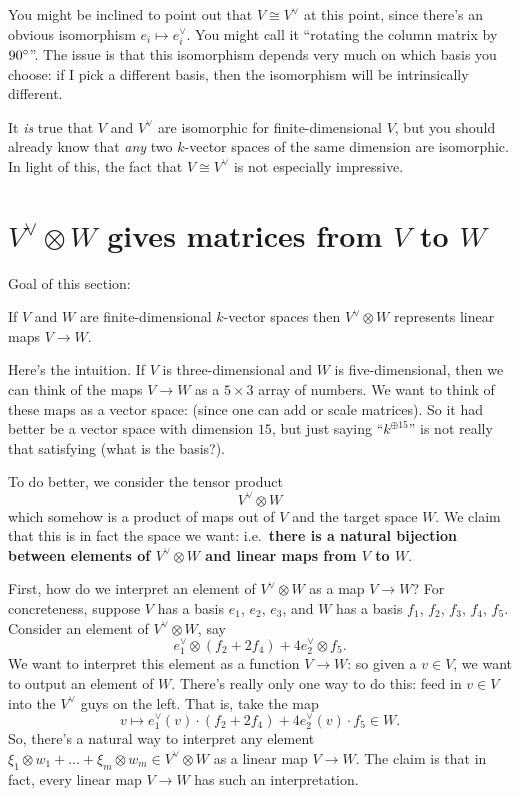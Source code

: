 You might be inclined to point out that $V \cong V^\vee$ at this point,
since there's an obvious isomorphism $e_i \mapsto e_i^\vee$.
You might call it ``rotating the column matrix by $90^\circ$''.
The issue is that this isomorphism
depends very much on which basis you choose:
if I pick a different basis, then the isomorphism
will be intrinsically different.

It \emph{is} true that $V$ and $V^\vee$ are isomorphic
for finite-dimensional $V$,
but you should already know that \emph{any} two $k$-vector spaces
of the same dimension are isomorphic.
In light of this, the fact that $V \cong V^\vee$ is not especially impressive.

\section{$V^\vee \otimes W$ gives matrices from $V$ to $W$}
Goal of this section:
\begin{moral}
	If $V$ and $W$ are finite-dimensional $k$-vector spaces
	then $V^\vee \otimes W$ represents linear maps $V \to W$.
\end{moral}

Here's the intuition.
If $V$ is three-dimensional and $W$ is five-dimensional, then we can think
of the maps $V \to W$ as a $5 \times 3$ array of numbers.
We want to think of these maps as a vector space:
(since one can add or scale matrices).
So it had better be a vector space with dimension $15$,
but just saying ``$k^{\oplus 15}$'' is not really that satisfying
(what is the basis?).

To do better, we consider the tensor product
\[ V^\vee \otimes W \]
which somehow is a product of maps out of $V$ and the target space $W$.
We claim that this is in fact the space we want:
i.e.\ \textbf{there is a natural bijection between elements of $V^\vee \otimes W$
and linear maps from $V$ to $W$}.

First, how do we interpret an element of $V^\vee \otimes W$ as a map $V \to W$?
For concreteness, suppose $V$ has a basis $e_1$, $e_2$, $e_3$,
and $W$ has a basis $f_1$, $f_2$, $f_3$, $f_4$, $f_5$.
Consider an element of $V^\vee \otimes W$, say
\[ e_1^\vee \otimes (f_2 + 2f_4) + 4e_2^\vee \otimes f_5. \]
We want to interpret this element as a function $V \to W$:
so given a $v \in V$,
we want to output an element of $W$.
There's really only one way to do this:
feed in $v \in V$ into the $V^\vee$ guys on the left.
That is, take the map
\[ v \mapsto e_1^\vee(v) \cdot (f_2 + 2f_4) + 4e_2^\vee(v) \cdot f_5 \in W. \]
So, there's a natural way to interpret any element
$\xi_1 \otimes w_1 + \dots + \xi_m \otimes w_m \in V^\vee \otimes W$
as a linear map $V \to W$.
The claim is that in fact, every linear map $V \to W$ has
such an interpretation.

